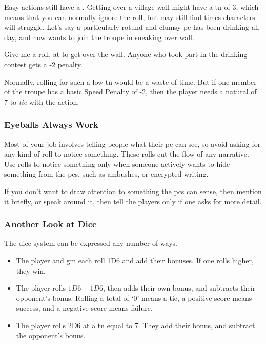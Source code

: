\begin{multicols}{2}
Easy actions still have a . 
Getting over a \gls{village} wall might have a \gls{tn} of 3, which means that you can normally ignore the roll, but may still find times characters will struggle.
Let's say a particularly rotund and clumsy \gls{pc} has been drinking all day, and now wants to join the troupe in sneaking over  wall.

\begin{speechtext}
  Give me a  roll, at \tn[3] to get over the wall.
  Anyone who took part in the drinking contest gets a -2 penalty.
\end{speechtext}

\noindent
Normally, rolling for such a low \gls{tn} would be a waste of time.
But if one member of the troupe has a basic Speed Penalty of -2, then the player needs a \gls{natural} of 7 to \emph{tie} with the action.

\subsubsection{Eyeballs Always Work}

Most of your job involves telling people what their \gls{pc} can see, so avoid asking for any kind of roll to notice something.
These rolls cut the flow of any narrative.
Use rolls to notice something only when someone actively wants to hide something from the \glspl{pc}, such as ambushes, or encrypted writing.

If you don't want to draw attention to something the \glspl{pc} can sense, then mention it briefly, or speak around it, then tell the players only if one asks for more detail.

\subsubsection{Another Look at Dice}

The dice system can be expressed any number of ways.

\begin{itemize}

  \item
  The player and \gls{gm} each roll 1D6 and add their bonuses.
  If one rolls higher, they win.
  \item
  The player rolls $1D6-1D6$, then adds their own bonus, and subtracts their opponent's bonus.
  Rolling a total of `0' means a tie, a positive score means success, and a negative score means failure.
  \item
  The player rolls 2D6 at a \gls{tn} equal to 7.
  They add their bonus, and subtract the opponent's bonus.


\end{itemize}
\end{multicols}
